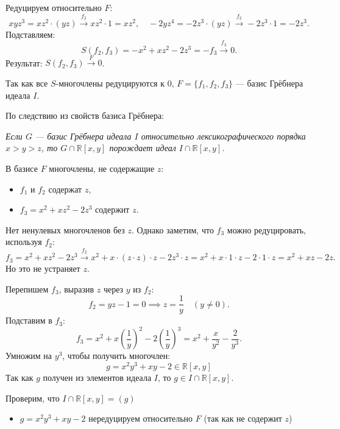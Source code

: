 \documentclass[a4paper]{article}
\begin{document}
\begin{enumerate}
\begin{itemize}
   Редуцируем относительно \( F \):  
     \[
     xyz^3 = xz^2 \cdot (yz) \xrightarrow{f_2} xz^2 \cdot 1 = xz^2, \quad -2yz^4 = -2z^3 \cdot (yz) \xrightarrow{f_2} -2z^3 \cdot 1 = -2z^3.
     \]  
     Подставляем:  
     \[
     S(f_2, f_3) = -x^2 + xz^2 - 2z^3 = -f_3 \xrightarrow{f_3} 0.
     \]  
   Результат: \( S(f_2, f_3) \xrightarrow{F} 0 \).  

  \end{itemize}

  
  Так как все \( S \)-многочлены редуцируются к 0, \( F = \{f_1, f_2, f_3\} \) 
  — базис Грёбнера идеала \( I \).  

  По следствию из свойств базиса Грёбнера:  
  
  \emph{
    Если \( G \) — базис Грёбнера идеала \( I \) относительно лексикографического порядка \( x > y > z \), то  
    \( G \cap \mathbb{R}[x,y] \) порождает идеал \( I \cap \mathbb{R}[x,y] \).  
  }


  В базисе \( F \) многочлены, не содержащие \( z \):  
  \begin{itemize}
    \item 
    \( f_1 \) и \( f_2 \) содержат \( z \), 
    \item 
    \( f_3 = x^2 + xz^2 - 2z^3 \) содержит \( z \).  
  \end{itemize}

  
  Нет ненулевых многочленов без \( z \). Однако заметим, что \( f_3 \) 
  можно редуцировать, используя \( f_2 \):  
  \[
  f_3 = x^2 + xz^2 - 2z^3 \xrightarrow{f_2} x^2 + x \cdot (z \cdot z) \cdot z - 2z^3 \cdot z = x^2 + x \cdot 1 \cdot z - 2 \cdot 1 \cdot z = x^2 + xz - 2z.
  \]  
  Но это не устраняет \( z \).  

  Перепишем \( f_3 \), выразив \( z \) через \( y \) из \( f_2 \):  
  \[
  f_2 = yz - 1 = 0 \implies z = \frac{1}{y} \quad (y \neq 0).
  \]  
  Подставим в \( f_3 \):  
  \[
  f_3 = x^2 + x \left(\frac{1}{y}\right)^2 - 2 \left(\frac{1}{y}\right)^3 =
   x^2 + \frac{x}{y^2} - \frac{2}{y^3}.
  \]  
  Умножим на \( y^3 \), чтобы получить многочлен:  
  \[
  g = x^2 y^3 + x y - 2 \in \mathbb{R}[x,y]
  \]  
  Так как \( g \) получен из элементов идеала \( I \), то
   \( g \in I \cap \mathbb{R}[x,y] \).  

   Проверим, что \( I \cap \mathbb{R}[x,y] = (g) \)
   \begin{itemize}
    \item \( g = x^2 y^3 + x y - 2 \) нередуцируем относительно \( F \) (так как не содержит \( z \))
    

\end{itemize}
\end{enumerate}
\end{document}
